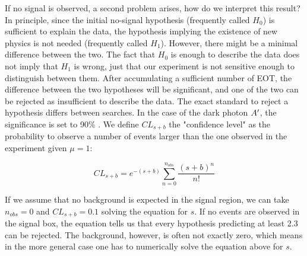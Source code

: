 If no signal is observed, a second problem arises, how do we interpret this result? In principle, since the initial no-signal hypothesis (frequently called $H_0$) is sufficient to explain the data, the hypothesis implying the existence of new physics is not needed (frequently called $H_1$). However, there might be a minimal difference between the two. The fact that $H_0$ is enough to describe the data does not imply that $H_1$ is wrong, just that our experiment is not sensitive enough to distinguish between them. After accumulating a sufficient number of EOT, the difference between the two hypotheses will be significant, and one of the two can be rejected as insufficient to describe the data.
The exact standard to reject a hypothesis differs between searches. In the case of the dark photon $A'$, the significance is set to 90\% \cite{battaglieri2017cosmic}. We define $CL_{s+b}$ the "confidence level" as the probability to observe a number of events larger than the one observed in the experiment given $\mu = 1$:

\begin{equation}
  \label{eq:confidence-level-poisson}
  CL_{s+b} = e^{-(s+b)}\sum^{n_{obs}}_{n=0} \frac{(s+b)^n}{n!}
\end{equation}

If we assume that no background is expected in the signal region, we can take $n_{obs} = 0$ and $CL_{s+b} = 0.1$ solving the equation for $s$. If no events are observed in the signal box, the equation tells us that every hypothesis predicting at least 2.3 can be rejected. The background, however, is often not exactly zero, which means in the more general case one has to numerically solve the equation above for $s$.


